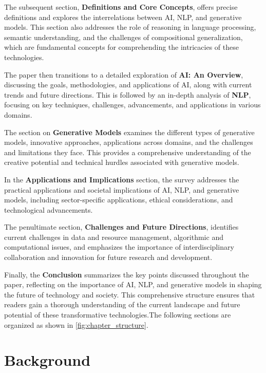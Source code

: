 The subsequent section, \textbf{Definitions and Core Concepts}, offers precise definitions and explores the interrelations between AI, NLP, and generative models. This section also addresses the role of reasoning in language processing, semantic understanding, and the challenges of compositional generalization, which are fundamental concepts for comprehending the intricacies of these technologies.



The paper then transitions to a detailed exploration of \textbf{AI: An Overview}, discussing the goals, methodologies, and applications of AI, along with current trends and future directions. This is followed by an in-depth analysis of \textbf{NLP}, focusing on key techniques, challenges, advancements, and applications in various domains.



The section on \textbf{Generative Models} examines the different types of generative models, innovative approaches, applications across domains, and the challenges and limitations they face. This provides a comprehensive understanding of the creative potential and technical hurdles associated with generative models.



In the \textbf{Applications and Implications} section, the survey addresses the practical applications and societal implications of AI, NLP, and generative models, including sector-specific applications, ethical considerations, and technological advancements.



The penultimate section, \textbf{Challenges and Future Directions}, identifies current challenges in data and resource management, algorithmic and computational issues, and emphasizes the importance of interdisciplinary collaboration and innovation for future research and development.



Finally, the \textbf{Conclusion} summarizes the key points discussed throughout the paper, reflecting on the importance of AI, NLP, and generative models in shaping the future of technology and society. This comprehensive structure ensures that readers gain a thorough understanding of the current landscape and future potential of these transformative technologies.The following sections are organized as shown in \autoref{fig:chapter_structure}.





\section{Background} \label{sec:Background}



